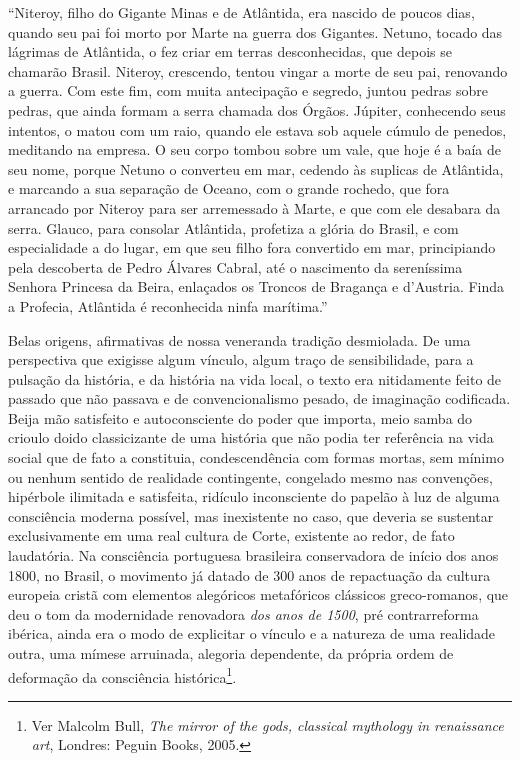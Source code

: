 ``Niteroy, filho do Gigante Minas e de Atlântida, era nascido de poucos
dias, quando seu pai foi morto por Marte na guerra dos Gigantes. Netuno,
tocado das lágrimas de Atlântida, o fez criar em terras desconhecidas,
que depois se chamarão Brasil. Niteroy, crescendo, tentou vingar a morte
de seu pai, renovando a guerra. Com este fim, com muita antecipação e
segredo, juntou pedras sobre pedras, que ainda formam a serra chamada
dos Órgãos. Júpiter, conhecendo seus intentos, o matou com um raio,
quando ele estava sob aquele cúmulo de penedos, meditando na empresa. O
seu corpo tombou sobre um vale, que hoje é a baía de seu nome, porque
Netuno o converteu em mar, cedendo às suplicas de Atlântida, e marcando
a sua separação de Oceano, com o grande rochedo, que fora arrancado por
Niteroy para ser arremessado à Marte, e que com ele desabara da serra.
Glauco, para consolar Atlântida, profetiza a glória do Brasil, e com
especialidade a do lugar, em que seu filho fora convertido em mar,
principiando pela descoberta de Pedro Álvares Cabral, até o nascimento
da sereníssima Senhora Princesa da Beira, enlaçados os Troncos de
Bragança e d'Austria. Finda a Profecia, Atlântida é reconhecida ninfa
marítima.''

Belas origens, afirmativas de nossa veneranda tradição desmiolada. De
uma perspectiva que exigisse algum vínculo, algum traço de
sensibilidade, para a pulsação da história, e da história na vida local,
o texto era nitidamente feito de passado que não passava e de
convencionalismo pesado, de imaginação codificada. Beija mão satisfeito
e autoconsciente do poder que importa, meio samba do crioulo doido
classicizante de uma história que não podia ter referência na vida
social que de fato a constituia, condescendência com formas mortas, sem
mínimo ou nenhum sentido de realidade contingente, congelado mesmo nas
convenções, hipérbole ilimitada e satisfeita, ridículo inconsciente do
papelão à luz de alguma consciência moderna possível, mas inexistente no
caso, que deveria se sustentar exclusivamente em uma real cultura de
Corte, existente ao redor, de fato laudatória. Na consciência portuguesa
brasileira conservadora de início dos anos 1800, no Brasil, o movimento
já datado de 300 anos de repactuação da cultura europeia cristã com
elementos alegóricos metafóricos clássicos greco-romanos, que deu o tom
da modernidade renovadora \emph{dos anos de 1500}, pré contrarreforma
ibérica, ainda era o modo de explicitar o vínculo e a natureza de uma
realidade outra, uma mímese arruinada, alegoria dependente, da própria
ordem de deformação da consciência histórica\footnote{Ver Malcolm Bull,
  \emph{The mirror of the gods, classical mythology in renaissance art},
  Londres: Peguin Books, 2005.}.


